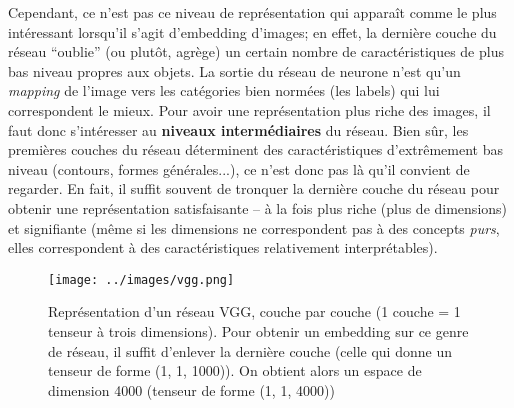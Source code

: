 \documentclass[french]{article}
\begin{document}
				Cependant, ce n'est pas ce niveau de représentation qui apparaît comme le plus intéressant lorsqu'il s'agit d'embedding d'images; en effet, la dernière couche du réseau ``oublie'' (ou plutôt, agrège) un certain nombre de caractéristiques de plus bas niveau propres aux objets. La sortie du réseau de neurone n'est qu'un \textit{mapping} de l'image vers les catégories bien normées (les labels) qui lui correspondent le mieux. Pour avoir une représentation plus riche des images, il faut donc s'intéresser au \textbf{niveaux intermédiaires} du réseau. Bien sûr, les premières couches du réseau déterminent des caractéristiques d'extrêmement bas niveau (contours, formes générales...), ce n'est donc pas là qu'il convient de regarder. En fait, il suffit souvent de tronquer la dernière couche du réseau pour obtenir une représentation satisfaisante -- à la fois plus riche (plus de dimensions) et signifiante (même si les dimensions ne correspondent pas à des concepts \textit{purs}, elles correspondent à des caractéristiques relativement interprétables).
				\begin{figure}[H]
					\centering
					\texttt{[image: ../images/vgg.png]}
					\caption[bla]{Représentation d'un réseau VGG\footnotemark, couche par couche (1 couche = 1 tenseur à trois dimensions). Pour obtenir un embedding sur ce genre de réseau, il suffit d'enlever la dernière couche (celle qui donne un tenseur de forme (1, 1, 1000)). On obtient alors un espace de dimension 4000 (tenseur de forme (1, 1, 4000))}
				\end{figure}
				
\end{document}
